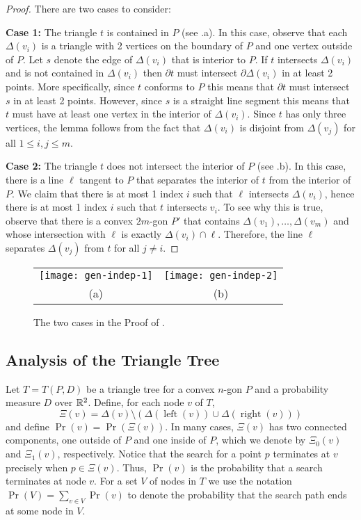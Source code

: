 \documentclass[charterfonts,lotsofwhite]{patmorin}
\newcommand{\boundary}{\partial}
\DeclareMathOperator{\lft}{left}
\DeclareMathOperator{\rght}{right}
\begin{document}
\begin{proof}
There are two cases to consider:

\noindent\textbf{Case 1:} The triangle $t$ is contained in $P$ (see
.a).  In this case, observe that each $\Delta(v_i)$
is a triangle with 2 vertices on the boundary of $P$ and one vertex
outside of $P$. Let $s$ denote the edge of $\Delta(v_i)$ that is
interior to $P$.  If $t$ intersects $\Delta(v_i)$ and is not contained
in $\Delta(v_i)$ then $\boundary t$ must intersect
$\boundary\Delta(v_i)$ in at least 2 points.  More specifically, since
$t$ conforms to $P$ this means that $\boundary t$ must intersect $s$
in at least 2 points.  However, since $s$ is a straight line segment
this means that $t$ must have at least one vertex in the interior of
$\Delta(v_i)$.  Since $t$ has only three vertices, the lemma follows
from the fact that $\Delta(v_i)$ is disjoint from $\Delta(v_j)$ for
all $1\le i,j\le m$.

\noindent \textbf{Case 2:} The triangle $t$ does not intersect the
interior of $P$ (see .b). In this case, there is a
line $\ell$ tangent to $P$ that separates the interior of $t$ from the
interior of $P$.  We claim that there is at most 1 index $i$ such that
$\ell$ intersects $\Delta(v_i)$, hence there is at most 1 index $i$ such
that $t$ intersects $v_i$.  To see why this is true, observe that
there is a convex $2m$-gon $P'$ that contains
$\Delta(v_1),\ldots,\Delta(v_m)$ and whose intersection with $\ell$ is
exactly $\Delta(v_i)\cap \ell$.  Therefore, the line $\ell$ separates
$\Delta(v_j)$ from $t$ for all $j\neq i$.
\end{proof}

\begin{figure}
  \begin{center}
   \begin{tabular}{cc}
     \texttt{[image: gen-indep-1]} & \texttt{[image: gen-indep-2]} \\
     (a) & (b) 
   \end{tabular}
  \end{center}
  \caption{The two cases in the Proof of .}
\end{figure}

\subsection{Analysis of the Triangle Tree}

Let $T=T(P,D)$ be a triangle tree for a convex $n$-gon $P$ and a
probability measure 
$D$ over $\mathbb{R}^2$. Define, for each node $v$ of $T$,
\[
   \Xi(v)=\Delta(v)\setminus (\Delta(\lft(v))\cup \Delta(\rght(v)))
\]
and define $\Pr(v)=\Pr(\Xi(v))$.  
In many cases, $\Xi(v)$ has two connected components, one outside of
$P$ and one inside of $P$, which we denote
by $\Xi_0(v)$ and $\Xi_1(v)$, respectively.
Notice that the search for a point
$p$ terminates at $v$ precisely when $p\in\Xi(v)$.  Thus, $\Pr(v)$ is
the probability that a search terminates at node $v$.  For a set $V$
of nodes in $T$ we use the notation $\Pr(V)=\sum_{v\in V}\Pr(v)$ to
denote the probability that the search path ends at some node in $V$.
\end{document}
